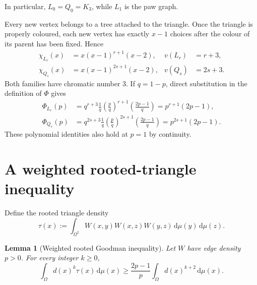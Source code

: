 \documentclass[11pt]{article}
\newtheorem{lemma}[theorem]{Lemma}
\newcommand{\dd}{\,\mathrm{d}}
\begin{document}
In particular, $L_0=Q_0=K_3$, while $L_1$ is the paw graph.

Every new vertex belongs to a tree attached to the triangle.  Once the
triangle is properly coloured, each new vertex has exactly $x-1$ choices
after the colour of its parent has been fixed.  Hence
\begin{align}
\chi_{L_r}(x)
&=x(x-1)^{r+1}(x-2),
&v(L_r)&=r+3,
\label{eq:chrom-L}
\\
\chi_{Q_s}(x)
&=x(x-1)^{2s+1}(x-2),
&v(Q_s)&=2s+3.
\label{eq:chrom-Q}
\end{align}
Both families have chromatic number $3$.  If $q=1-p$, direct substitution
in the definition of $\Phi$ gives
\begin{align}
\Phi_{L_r}(p)
&=
q^{r+3}\frac1q
\left(\frac pq\right)^{r+1}
\left(\frac{2p-1}{q}\right)
=p^{r+1}(2p-1),
\label{eq:target-L}
\\
\Phi_{Q_s}(p)
&=
q^{2s+3}\frac1q
\left(\frac pq\right)^{2s+1}
\left(\frac{2p-1}{q}\right)
=p^{2s+1}(2p-1).
\label{eq:target-Q}
\end{align}
These polynomial identities also hold at $p=1$ by continuity.


\section{A weighted rooted-triangle inequality}

Define the rooted triangle density
\[
\tau(x)
:=
\int_{\Omega^2}
W(x,y)W(x,z)W(y,z)
\dd\mu(y)\dd\mu(z).
\]

\begin{lemma}[Weighted rooted Goodman inequality]
\label{lem:weighted-rooted}
Let $W$ have edge density $p>0$.  For every integer $k\geq0$,
\[
\int_\Omega d(x)^k\tau(x)\dd\mu(x)
\geq
\frac{2p-1}{p}
\int_\Omega d(x)^{k+2}\dd\mu(x).
\]
\end{lemma}
\end{document}
